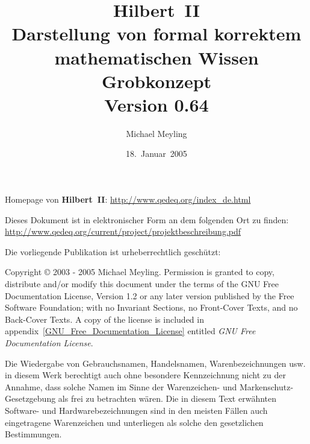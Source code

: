 \documentclass[a4paper,german,10pt,twoside]{book}
\title{
\textbf{Hilbert~II} \\
\vspace*{1cm} Darstellung von formal korrektem mathematischen Wissen\\
\vspace*{1cm} Grobkonzept \\
\vspace*{0.1cm} {\small Version 0.64}}
\author{Michael Meyling}
\date{18.~Januar~2005}
\begin{document}
\maketitle

\setlength{\parskip}{5pt plus 2pt minus 1pt}  %
Homepage von \textbf{Hilbert~II}: \url{http://www.qedeq.org/index_de.html}
\par
\vfill
\par
Dieses Dokument ist in elektronischer Form an dem folgenden Ort zu finden:
\url{http://www.qedeq.org/current/project/projektbeschreibung.pdf}
\par
Die vorliegende Publikation ist urheberrechtlich gesch{\"u}tzt:
\par
Copyright \copyright{} 2003 - 2005 Michael Meyling. Permission is granted to copy, distribute
and/or modify this document under the terms of the GNU Free Documentation License, Version 1.2 or
any later version published by the Free Software Foundation; with no Invariant Sections, no
Front-Cover Texts, and no Back-Cover Texts. A copy of the license is included in
appendix~\ref{GNU_Free_Documentation_License} entitled \emph{GNU Free Documentation License}.
\par
Die Wiedergabe von Gebrauchsnamen, Handelsnamen, Warenbezeichnungen usw. in diesem Werk berechtigt
auch ohne besondere Kennzeichnung nicht zu der Annahme, dass solche Namen im Sinne der
Warenzeichen- und Markenschutz-Gesetzgebung als frei zu betrachten w{\"a}ren. Die in diesem Text
erw{\"a}hnten Software- und Hardwarebezeichnungen sind in den meisten F{\"a}llen auch eingetragene
Warenzeichen und unterliegen als solche den gesetzlichen Bestimmungen.

\setlength{\parskip}{0pt}					  %
\tableofcontents
\setlength{\parskip}{5pt plus 2pt minus 1pt}  %
\end{document}
